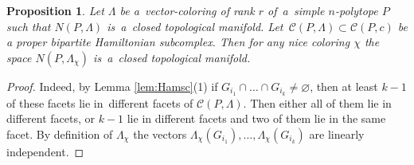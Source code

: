 \documentclass[12pt]{amsart}
\newtheorem{proposition}[formula]{Proposition}
\theoremstyle{definition}
\theoremstyle{remark}
\begin{document}
\begin{proposition}\label{prop:indman}
Let $\Lambda$ be a~vector-coloring of rank $r$ of~a~simple $n$-polytope $P$ such that $N(P,\Lambda)$
is~a~closed topological manifold. Let~$\mathcal{C}(P,\Lambda)\subset\mathcal{C}(P,c)$ be 
a proper bipartite Hamiltonian subcomplex. Then for any nice coloring $\chi$ the space 
$N(P,\Lambda_{\chi})$ is~a~closed topological manifold.
\end{proposition}
\begin{proof}
Indeed, by Lemma \ref{lem:Hamsc}(1) if $G_{i_1}\cap \dots\cap G_{i_k}\ne\varnothing$, then at least 
$k-1$ of these facets lie in~different facets of $\mathcal{C}(P,\Lambda)$. Then either all of them
lie in different facets, or $k-1$ lie in different facets and two of them lie in the same facet. By definition
of $\Lambda_{\chi}$ the vectors $\Lambda_{\chi}(G_{i_1}), \dots, \Lambda_{\chi}(G_{i_k})$ are linearly independent.
\end{proof}
\end{document}
